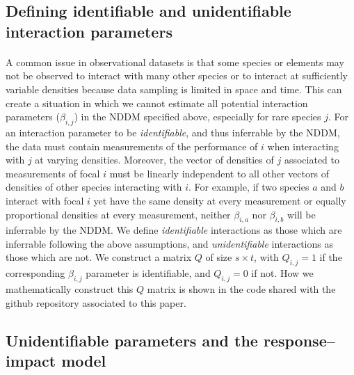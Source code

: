 \documentclass[a4,12pt]{article}
\begin{document}
    \subsection{Defining identifiable and unidentifiable interaction parameters}
    \label{meth:id_params}

    \paragraph{}
    A common issue in observational datasets is that some species or elements may not be observed to interact with many other species or to interact at sufficiently variable densities because data sampling is limited in space and time. This can create a situation in which we cannot estimate all potential interaction parameters ($\beta_{i,j}$) in the NDDM specified above, especially for rare species $j$. For an interaction parameter to be \textit{identifiable}, and thus inferrable by the NDDM, the data must contain measurements of the performance of $i$ when interacting with $j$ at varying densities. Moreover, the vector of densities of $j$ associated to measurements of focal $i$ must be linearly independent to all other vectors of densities of other species interacting with $i$. For example, if two species $a$ and $b$ interact with focal $i$ yet have the same density at every measurement or equally proportional densities at every measurement, neither $\beta_{i, a}$ nor $\beta_{i, b}$ will be inferrable by the NDDM. We define \textit{identifiable} interactions as those which are inferrable following the above assumptions, and \textit{unidentifiable} interactions as those which are not. We construct a matrix $Q$ of size $s \times t$, with $Q_{i, j} = 1$ if the corresponding $\beta_{i, j}$ parameter is identifiable, and $Q_{i, j} = 0$ if not. How we mathematically construct this $Q$ matrix is shown in the code shared with the github repository associated to this paper.
    
    \subsection{Unidentifiable parameters and the response--impact model}
    \label{meth:rim}
\end{document}
